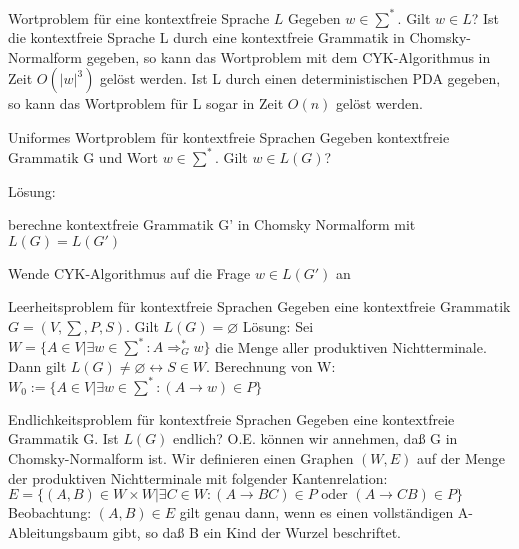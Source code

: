 \documentclass[avery5371, frame]{flashcards}
\begin{document}
\begin{flashcard}[Definition]{ Wortproblem für eine kontextfreie Sprache $L$}
    Gegeben $w\in\sum^*$. Gilt $w\in L$?
    Ist die kontextfreie Sprache L durch eine kontextfreie Grammatik in Chomsky-Normalform gegeben, so kann das Wortproblem mit dem CYK-Algorithmus in Zeit $O(|w|^3)$ gelöst werden.
    Ist L durch einen deterministischen PDA gegeben, so kann das Wortproblem für L sogar in Zeit $O(n)$ gelöst werden.
\end{flashcard}

\begin{flashcard}[Definition]{ Uniformes Wortproblem für kontextfreie Sprachen}
    Gegeben kontextfreie Grammatik G und Wort $w\in\sum^*$. Gilt $w\in L(G)$?

    Lösung:
    \begin{itemize*}
        \item berechne kontextfreie Grammatik G' in Chomsky Normalform mit $L(G)=L(G')$
        \item Wende CYK-Algorithmus auf die Frage $w\in L(G')$ an
    \end{itemize*}
\end{flashcard}

\begin{flashcard}[Definition]{ Leerheitsproblem für kontextfreie Sprachen}
    Gegeben eine kontextfreie Grammatik $G=(V,\sum,P,S)$. Gilt $L(G)=\varnothing$
    Lösung: Sei $W=\{A\in V | \exists w\in\sum^*: A\Rightarrow_G^* w\}$ die Menge aller produktiven Nichtterminale. Dann gilt $L(G)\not= \varnothing \leftrightarrow S\in W$. Berechnung von W:
    $W_0:=\{A\in V | \exists w\in\sum^*:(A\rightarrow w)\in P\}$
\end{flashcard}

\begin{flashcard}[Definition]{ Endlichkeitsproblem für kontextfreie Sprachen}
    Gegeben eine kontextfreie Grammatik G. Ist $L(G)$ endlich?
    O.E. können wir annehmen, daß G in Chomsky-Normalform ist. Wir definieren einen Graphen $(W , E )$ auf der Menge der produktiven Nichtterminale mit folgender Kantenrelation: $E=\{(A,B)\in W\times W | \exists C \in W: (A\rightarrow BC)\in P \text{ oder } (A\rightarrow CB)\in P\}$
    Beobachtung: $(A,B)\in E$ gilt genau dann, wenn es einen vollständigen A-Ableitungsbaum gibt, so daß B ein Kind der Wurzel beschriftet.
\end{flashcard}
\end{document}
